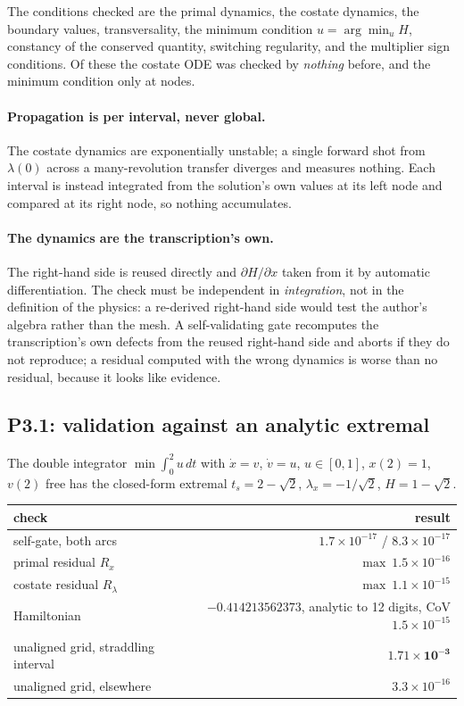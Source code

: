 \documentclass[11pt]{article}
\begin{document}
The conditions checked are the primal dynamics, the costate dynamics, the
boundary values, transversality, the minimum condition $u = \arg\min_u H$,
constancy of the conserved quantity, switching regularity, and the multiplier
sign conditions. Of these the costate ODE was checked by \emph{nothing} before,
and the minimum condition only at nodes.

\paragraph{Propagation is per interval, never global.} The costate dynamics are
exponentially unstable; a single forward shot from $\lambda(0)$ across a
many-revolution transfer diverges and measures nothing. Each interval is
instead integrated from the solution's own values at its left node and compared
at its right node, so nothing accumulates.

\paragraph{The dynamics are the transcription's own.} The right-hand side is
reused directly and $\partial H/\partial x$ taken from it by automatic
differentiation. The check must be independent in \emph{integration}, not in
the definition of the physics: a re-derived right-hand side would test the
author's algebra rather than the mesh. A self-validating gate recomputes the
transcription's own defects from the reused right-hand side and aborts if they
do not reproduce; a residual computed with the wrong dynamics is worse than no
residual, because it looks like evidence.

\subsection{P3.1: validation against an analytic extremal}

The double integrator $\min\int_0^2 u\,dt$ with $\dot x = v$, $\dot v = u$,
$u\in[0,1]$, $x(2)=1$, $v(2)$ free has the closed-form extremal
$t_s = 2-\sqrt2$, $\lambda_x = -1/\sqrt2$, $H = 1-\sqrt2$.

\begin{table}[h]
\centering\small
\begin{tabular}{lr}
\toprule
check & result \\
\midrule
self-gate, both arcs & $1.7\times10^{-17}$ / $8.3\times10^{-17}$ \\
primal residual $R_x$ & $\max\ 1.5\times10^{-16}$ \\
costate residual $R_\lambda$ & $\max\ 1.1\times10^{-15}$ \\
Hamiltonian & $-0.414213562373$, analytic to 12 digits, CoV $1.5\times10^{-15}$ \\
unaligned grid, straddling interval & $\mathbf{1.71\times10^{-3}}$ \\
unaligned grid, elsewhere & $3.3\times10^{-16}$ \\
\bottomrule
\end{tabular}
\end{table}
\end{document}
